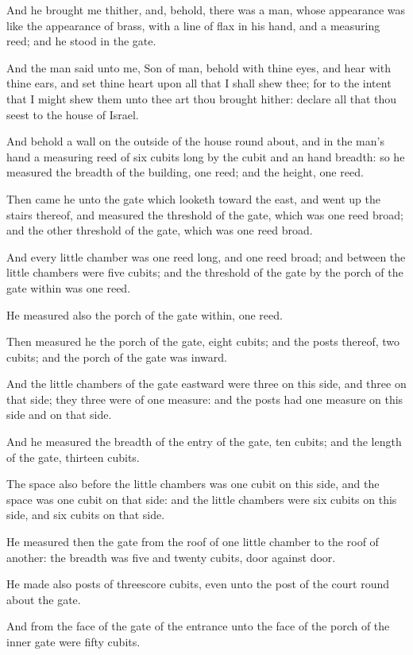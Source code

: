 \Verse And he brought me thither, and, behold, there was a man, whose appearance was like the appearance of brass, with a line of flax in his hand, and a measuring reed; and he stood in the gate.

\Verse And the man said unto me, Son of man, behold with thine eyes, and hear with thine ears, and set thine heart upon all that I shall shew thee; for to the intent that I might shew them unto thee art thou brought hither: declare all that thou seest to the house of Israel.

\Verse And behold a wall on the outside of the house round about, and in the man's hand a measuring reed of six cubits long by the cubit and an hand breadth: so he measured the breadth of the building, one reed; and the height, one reed.

\Verse Then came he unto the gate which looketh toward the east, and went up the stairs thereof, and measured the threshold of the gate, which was one reed broad; and the other threshold of the gate, which was one reed broad.

\Verse And every little chamber was one reed long, and one reed broad; and between the little chambers were five cubits; and the threshold of the gate by the porch of the gate within was one reed.

\Verse He measured also the porch of the gate within, one reed.

\Verse Then measured he the porch of the gate, eight cubits; and the posts thereof, two cubits; and the porch of the gate was inward.

\Verse And the little chambers of the gate eastward were three on this side, and three on that side; they three were of one measure: and the posts had one measure on this side and on that side.

\Verse And he measured the breadth of the entry of the gate, ten cubits; and the length of the gate, thirteen cubits.

\Verse The space also before the little chambers was one cubit on this side, and the space was one cubit on that side: and the little chambers were six cubits on this side, and six cubits on that side.

\Verse He measured then the gate from the roof of one little chamber to the roof of another: the breadth was five and twenty cubits, door against door.

\Verse He made also posts of threescore cubits, even unto the post of the court round about the gate.

\Verse And from the face of the gate of the entrance unto the face of the porch of the inner gate were fifty cubits.

